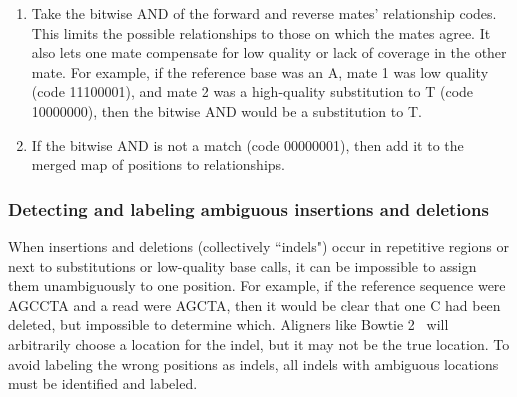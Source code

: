\documentclass[11pt]{article}
\begin{document}
\begin{enumerate}
\begin{enumerate}
        \item Take the bitwise AND of the forward and reverse mates' relationship codes. This limits the possible relationships to those on which the mates agree. It also lets one mate compensate for low quality or lack of coverage in the other mate. For example, if the reference base was an A, mate 1 was low quality (code 11100001), and mate 2 was a high-quality substitution to T (code 10000000), then the bitwise AND would be a substitution to T.
        \item If the bitwise AND is not a match (code 00000001), then add it to the merged map of positions to relationships.
    \end{enumerate}
\end{enumerate}


\subsubsection{Detecting and labeling ambiguous insertions and deletions}
\label{ambiguous-indels}

When insertions and deletions (collectively ``indels") occur in repetitive regions or next to substitutions or low-quality base calls, it can be impossible to assign them unambiguously to one position.
For example, if the reference sequence were AGCCTA and a read were AGCTA, then it would be clear that one C had been deleted, but impossible to determine which.
Aligners like Bowtie 2~\cite{Langmead2012} will arbitrarily choose a location for the indel, but it may not be the true location.
To avoid labeling the wrong positions as indels, all indels with ambiguous locations must be identified and labeled.
\end{document}
